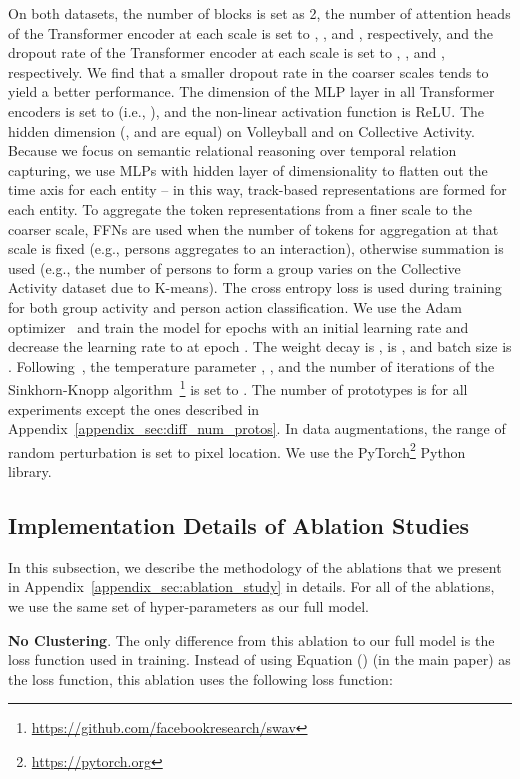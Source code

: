 \documentclass[runningheads]{llncs}
\begin{document}
On both datasets, the number of \mtx blocks  is set as 2, the number of attention heads of the Transformer encoder at each scale is set to , ,  and , respectively, and the dropout rate of the Transformer encoder at each scale is set to , ,  and , respectively. We find that a smaller dropout rate in the coarser scales tends to yield a better performance. The dimension of the MLP layer in all Transformer encoders is set to  (i.e., ), and the non-linear activation function is ReLU. The hidden dimension  (,  and  are equal) on Volleyball and  on Collective Activity.
Because we focus on semantic relational reasoning over temporal relation capturing,
we use MLPs with  hidden layer of dimensionality  to flatten out the time axis
for each entity -- in this way, track-based representations are formed for each entity.
To aggregate the token representations from a finer scale to the coarser scale, 
FFNs
are used when the number of tokens for aggregation 
at that scale 
is fixed (e.g.,  persons aggregates to an interaction),
otherwise
summation is used (e.g.,
the number of persons to form a group varies on the Collective Activity dataset due to 
K-means).
The cross entropy loss is used during training for both group activity and person action classification.
We use the Adam optimizer~\cite{kingma2014adam} and train the model for  epochs with an initial learning rate  and decrease the learning rate to  at epoch . The weight decay is ,  is , and batch size is .
Following~\cite{swav}, the temperature parameter
, , and the number of iterations of the Sinkhorn-Knopp algorithm~\footnote{\url{https://github.com/facebookresearch/swav}}
is set to . The number of prototypes  is  for all experiments except the ones described in Appendix~\ref{appendix_sec:diff_num_protos}. In data augmentations, the range of random perturbation is set to  pixel location.
We use the PyTorch\footnote{\url{https://pytorch.org}} Python library.

  


\subsection{Implementation Details of Ablation Studies}
\label{appendix_subsec:ablation_imple_details}

In this subsection, we describe the methodology of the ablations that we present in Appendix~\ref{appendix_sec:ablation_study} in details. For all of the ablations, we use the same set of hyper-parameters as our full model. 

\noindent \textbf{No Clustering}. The only difference from this ablation to our full model \ours is the loss function used in training. Instead of using Equation () (in the main paper) as the loss function, this ablation uses the following loss function:
\end{document}
